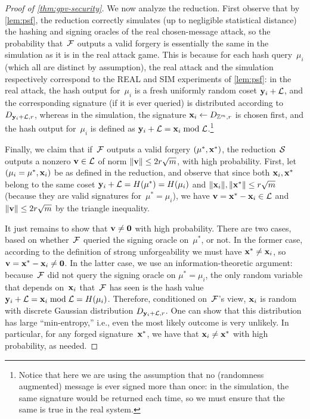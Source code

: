 \documentclass[11pt]{article}
\begin{document}
\begin{proof}[Proof of \cref{thm:gpv-security}]
  We now analyze the reduction. First observe that by \cref{lem:psf},
  the reduction correctly simulates (up to negligible statistical
  distance) the hashing and signing oracles of the real chosen-message
  attack, so the probability that~$\mathcal{F}$ outputs a valid forgery is
  essentially the same in the simulation as it is in the real attack
  game. This is because for each hash query~$\mu_{i}$ (which all are
  distinct by assumption), the real attack and the simulation
  respectively correspond to the REAL and SIM experiments of
  \cref{lem:psf}: in the real attack, the hash output for~$\mu_{i}$ is
  a fresh uniformly random coset $\mathbf{y}_{i} + \mathcal{L}$, and the
  corresponding signature (if it is ever queried) is distributed
  according to $D_{\mathbf{y}_{i}+\mathcal{L},r}$, whereas in the simulation, the
  signature $\mathbf{x}_{i} \gets D_{\mathbb{Z}^{m},r}$ is chosen first, and the
  hash output for~$\mu_{i}$ is defined as
  $\mathbf{y}_{i} + \mathcal{L} = \mathbf{x}_{i} \bmod \mathcal{L}$.\footnote{Notice that here
    we are using the assumption that no (randomness augmented) message
    is ever signed more than once: in the simulation, the same
    signature would be returned each time, so we must ensure that the
    same is true in the real system.}

  Finally, we claim that if~$\mathcal{F}$ outputs a valid forgery
  $(\mu^{*}, \mathbf{x}^{*})$, the reduction~$\mathcal{S}$ outputs a nonzero
  $\mathbf{v} \in \mathcal{L}$ of norm $\lVert\mathbf{v}\rVert \leq 2r \sqrt{m}$, with
  high probability. First, let $(\mu_{i} = \mu^{*}, \mathbf{x}_{i})$ be as
  defined in the reduction, and observe that since both
  $\mathbf{x}_{i}, \mathbf{x}^{*}$ belong to the same coset
  $\mathbf{y}_{i} + \mathcal{L} = H(\mu^{*}) = H(\mu_{i})$ and
  $\lVert\mathbf{x}_{i}\rVert, \lVert\mathbf{x}^{*}\rVert \leq r \sqrt{m}$ (because
  they are valid signatures for~$\mu^{*} = \mu_{i}$), we have
  $\mathbf{v} = \mathbf{x}^{*} - \mathbf{x}_{i} \in \mathcal{L}$ and
  $\lVert\mathbf{v}\rVert \leq 2r\sqrt{m}$ by the triangle inequality.

  It just remains to show that $\mathbf{v} \neq \mathbf{0}$ with high
  probability. There are two cases, based on whether~$\mathcal{F}$ queried
  the signing oracle on~$\mu^{*}$, or not. In the former case,
  according to the definition of strong unforgeability we must have
  $\mathbf{x}^{*} \neq \mathbf{x}_{i}$, so
  $\mathbf{v} = \mathbf{x}^{*} - \mathbf{x}_{i} \neq \mathbf{0}$. In the latter case,
  we use an information-theoretic argument: because~$\mathcal{F}$ did not
  query the signing oracle on $\mu^{*} = \mu_{i}$, the only random
  variable that depends on~$\mathbf{x}_{i}$ that~$\mathcal{F}$ has seen is the
  hash value $\mathbf{y}_{i} + \mathcal{L} = \mathbf{x}_{i} \bmod \mathcal{L} = H(\mu_{i})$.
  Therefore, conditioned on~$\mathcal{F}$'s view, $\mathbf{x}_{i}$ is random
  with discrete Gaussian distribution $D_{\mathbf{y}_{i}+\mathcal{L},r}$. One can
  show that this distribution has large ``min-entropy,'' i.e., even
  the most likely outcome is very unlikely. In particular, for any
  forged signature~$\mathbf{x}^{*}$, we have that
  $\mathbf{x}_{i} \neq \mathbf{x}^{*}$ with high probability, as needed.
\end{proof}
\end{document}

